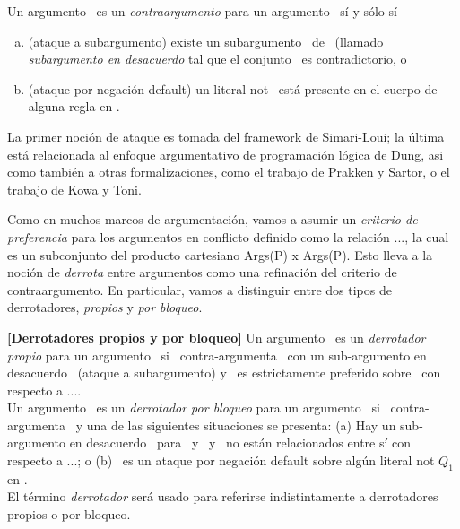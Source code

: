 \begin{definicion}
	Un argumento \AaQa\ es un \textit{contraargumento} para un argumento \AbQb\ sí y sólo sí
	
	\begin{enumerate}[a)]
	\item (ataque a subargumento) existe un subargumento \AQ\ de \AbQb\ (llamado 
	\textit{subargumento en desacuerdo} tal que el conjunto \SyQaQ\ es contradictorio, o
	\item (ataque por negación default) un literal not \ArgQa\ está presente en el cuerpo de alguna 
	regla en \ArgAb.
	\end{enumerate}	
	
\end{definicion}

La primer noción de ataque es tomada del framework de Simari-Loui; la última está relacionada al 
enfoque argumentativo de programación lógica de Dung, asi como también a otras formalizaciones,
como el trabajo de Prakken y Sartor, o el trabajo de Kowa y Toni.

Como en muchos marcos de argumentación, vamos a asumir un \textit{criterio de preferencia} para los 
argumentos en conflicto definido como la relación ..., la cual es un subconjunto del producto cartesiano 
Args(P) x Args(P). Esto lleva a la noción de \textit{derrota} entre argumentos como una refinación del 
criterio de contraargumento. En particular, vamos a distinguir entre dos tipos de derrotadores,
\textit{propios} y \textit{por bloqueo}.

\begin{definicion}\textbf{[Derrotadores propios y por bloqueo]}
	Un argumento \AaQa\ es un \textit{derrotador propio} para un argumento \AbQb\ si \AaQa\ contra-argumenta
	\AbQb\ con un sub-argumento en desacuerdo \AQ\ (ataque a subargumento) y \AaQa\ es estrictamente 
	preferido sobre \AQ\ con respecto a ....\\
	Un argumento \AaQa\ es un \textit{derrotador por bloqueo} para un argumento \AbQb\ si \AaQa\ contra-argumenta
	\AbQb\ y una de las siguientes situaciones se presenta: (a) Hay un sub-argumento en desacuerdo \AQ\ para
	\AbQb\, y \AaQa\ y \AQ\ no están relacionados entre sí con respecto a ...; o (b) \AaQa\ es un ataque 
	por negación default sobre algún literal not $Q_1$ en \AbQb.\\
	El término \textit{derrotador} será usado para referirse indistintamente a derrotadores propios o por bloqueo.
\end{definicion}

